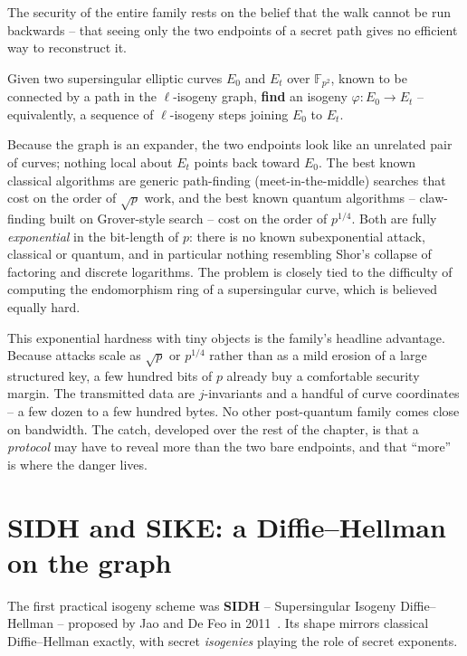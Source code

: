The security of the entire family rests on the belief that the walk cannot be run backwards -- that seeing only the two endpoints of a secret path gives no efficient way to reconstruct it.

\begin{definition}
Given two supersingular elliptic curves $E_0$ and $E_t$ over $\mathbb{F}_{p^2}$, known to be connected by a path in the $\ell$-isogeny graph, \textbf{find} an isogeny $\varphi : E_0 \to E_t$ -- equivalently, a sequence of $\ell$-isogeny steps joining $E_0$ to $E_t$.
\end{definition}

Because the graph is an expander, the two endpoints look like an unrelated pair of curves; nothing local about $E_t$ points back toward $E_0$. The best known classical algorithms are generic path-finding (meet-in-the-middle) searches that cost on the order of $\sqrt{p}$ work, and the best known quantum algorithms -- claw-finding built on Grover-style search -- cost on the order of $p^{1/4}$. Both are fully \emph{exponential} in the bit-length of $p$: there is no known subexponential attack, classical or quantum, and in particular nothing resembling Shor's collapse of factoring and discrete logarithms. The problem is closely tied to the difficulty of computing the endomorphism ring of a supersingular curve, which is believed equally hard.

This exponential hardness with tiny objects is the family's headline advantage. Because attacks scale as $\sqrt{p}$ or $p^{1/4}$ rather than as a mild erosion of a large structured key, a few hundred bits of $p$ already buy a comfortable security margin. The transmitted data are $j$-invariants and a handful of curve coordinates -- a few dozen to a few hundred bytes. No other post-quantum family comes close on bandwidth. The catch, developed over the rest of the chapter, is that a \emph{protocol} may have to reveal more than the two bare endpoints, and that ``more'' is where the danger lives.

\section{SIDH and SIKE: a Diffie--Hellman on the graph}

The first practical isogeny scheme was \textbf{SIDH} -- Supersingular Isogeny Diffie--Hellman -- proposed by Jao and De Feo in 2011~\cite{jaodefeo2011}. Its shape mirrors classical Diffie--Hellman exactly, with secret \emph{isogenies} playing the role of secret exponents.

